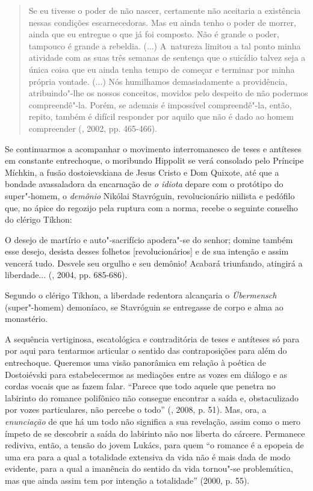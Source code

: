 {\begin{quote}
Se eu tivesse o poder de não nascer, certamente não aceitaria a
existência nessas condições escarnecedoras. Mas eu ainda tenho o poder
de morrer, ainda que eu entregue o que já foi composto. Não é grande o
poder, tampouco é grande a rebeldia. (...) A~natureza limitou a tal
ponto minha atividade com as suas três semanas de sentença que o
suicídio talvez seja a única coisa que eu ainda tenha tempo de começar e
terminar por minha própria vontade. (...) Nós humilhamos demasiadamente
a providência, atribuindo"-lhe os nossos conceitos, movidos pelo despeito
de não podermos compreendê"-la. Porém, se ademais é impossível
compreendê"-la, então, repito, também é difícil responder por aquilo que
não é dado ao homem compreender (, 2002, pp. 465-466).
\end{quote}

Se continuarmos a acompanhar o movimento interromanesco de teses e
antíteses em constante entrechoque, o moribundo Hippolit se verá
consolado pelo Príncipe Míchkin, a fusão dostoievskiana de Jesus Cristo
e Dom Quixote, até que a bondade avassaladora da encarnação de \emph{o
idiota} depare com o protótipo do super"-homem, o \emph{demônio} Nikólai
Stavróguin, revolucionário niilista e pedófilo que, no ápice do regozijo
pela ruptura com a norma, recebe o seguinte conselho do clérigo Tíkhon:

O desejo de martírio e auto"-sacrifício apodera"-se do senhor; domine
também esse desejo, desista desses folhetos {[}revolucionários{]} e de
sua intenção e assim vencerá tudo. Desvele seu orgulho e seu demônio!
Acabará triunfando, atingirá a liberdade... (, 2004, pp.
685-686).

Segundo o clérigo Tíkhon, a liberdade redentora alcançaria o
\emph{Übermensch} (super"-homem) demoníaco, se Stavróguin se entregasse
de corpo e alma ao monastério.

A sequência vertiginosa, escatológica e contraditória de teses e
antíteses só para por aqui para tentarmos articular o sentido das
contraposições para além do entrechoque. Queremos uma visão panorâmica
em relação à poética de Dostoiévski para estabelecermos as mediações
entre as vozes em diálogo e as cordas vocais que as fazem falar.
``Parece que todo aquele que penetra no labirinto do romance polifônico
não consegue encontrar a saída e, obstaculizado por vozes particulares,
não percebe o todo'' (, 2008, p. 51). Mas, ora, a
\emph{enunciação} de que há um todo não significa a sua revelação, assim
como o mero ímpeto de se descobrir a saída do labirinto não nos liberta
do cárcere. Permanece rediviva, então, a tensão do jovem Lukács, para
quem ``o romance é a epopeia de uma era para a qual a totalidade
extensiva da vida não é mais dada de modo evidente, para a qual a
imanência do sentido da vida tornou"-se problemática, mas que ainda assim
tem por intenção a totalidade'' (2000, p. 55).

}

